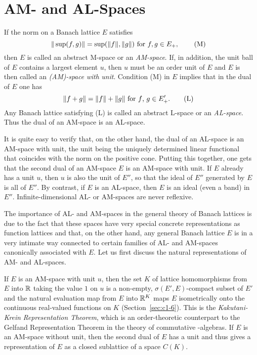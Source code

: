 \section{AM- and AL-Spaces}\label{sec:c1-4}
If the norm on a Banach lattice $ E $ satisfies
\begin{equation}\label{eq:c1-2}
	\|\sup(f,g)\| = \sup(\|f\|,\|g\|) \text{ for $ f, g \in E_{+}$, } \tag{M}
\end{equation}
then $ E $ is called an abstract M-space or an \emph{AM-space}.
If, in addition, the unit ball of $ E $ contains a largest element $ u $, then $ u $ must be an order unit of $ E $ and $ E $ is then called an \emph{(AM)-space with unit}.
Condition (M) in $ E $ implies that in the dual of $ E $ one has
\begin{equation}\label{eq:c1-3}
	\|f + g\| = \|f\| + \|g\| \text{ for $ f $, $ g \in E_{+}'$.} \tag{L}
\end{equation}
Any Banach lattice satisfying (L) is called an abstract L-space or an \emph{AL-space}.
Thus the dual of an AM-space is an AL-space.

It is quite easy to verify that, on the other hand, the dual of an AL-space is an AM-space with unit, the unit being the uniquely determined linear functional that coincides with the norm on the positive cone.
Putting this together, one gets that the second dual of an AM-space $ E $ is an AM-space with unit.
If $ E $ already has a unit $ u $, then $ u $ is also the unit of $ E'' $, so that the ideal of $ E'' $ generated by $ E $ is all of $ E'' $.
By contrast, if $ E $ is an AL-space, then $ E $ is an ideal (even a band) in $ E'' $.
Infinite-dimensional AL- or AM-spaces are never reflexive.

The importance of AL- and AM-spaces in the general theory of Banach lattices is due to the fact that these spaces have very special concrete representations as function lattices and that, on the other hand, any general Banach lattice $ E $ is in a very intimate way connected to certain families of AL- and AM-spaces canonically associated with $ E $.
Let us first discuss the natural representations of AM- and AL-spaces.

If $ E $ is an AM-space with unit $ u $, then the set $ K $ of lattice homomorphisms from $ E $ into $ \mathbb{R} $ taking the value $ 1 $ on $ u $ is a non-empty, $ \sigma(E',E) $-compact subset of $ E' $ and the natural evaluation map from $ E $ into $ \mathbb{R}^{K} $ maps $ E $ isometrically onto the continuous real-valued functions on $ K $ (\cf  Section~\ref{sec:c1-6}).
This is the \emph{Kakutani-Krein Representation Theorem}, which is an order-theoretic counterpart to the Gelfand Representation Theorem in the theory of commutative \CA-algebras.
If $ E $ is an AM-space without unit, then the second dual of $ E $ has a unit and thus gives a representation of $ E $ as a closed sublattice of a space $ C(K) $.


